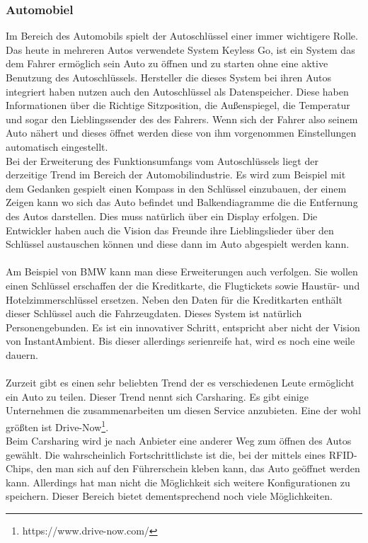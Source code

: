 \subsubsection{Automobiel} 
Im Bereich des Automobils spielt der Autoschlüssel einer immer wichtigere Rolle. Das heute in mehreren Autos verwendete System Keyless Go, ist ein System das dem Fahrer ermöglich sein Auto zu öffnen und zu starten ohne eine aktive Benutzung des Autoschlüssels. Hersteller die dieses System bei ihren Autos integriert haben nutzen auch den Autoschlüssel als Datenspeicher. Diese haben Informationen über die Richtige Sitzposition, die Außenspiegel, die Temperatur und sogar den Lieblingssender des des Fahrers. Wenn sich der Fahrer also seinem Auto nähert und dieses öffnet werden diese von ihm vorgenommen Einstellungen automatisch eingestellt. 
\\
Bei der Erweiterung des Funktionsumfangs vom Autoschlüssels liegt der derzeitige Trend im Bereich der Automobilindustrie.
Es wird zum Beispiel mit dem Gedanken gespielt einen Kompass in den Schlüssel einzubauen, der einem Zeigen kann wo sich das Auto befindet und Balkendiagramme die die Entfernung des Autos darstellen. Dies muss natürlich über ein Display erfolgen. 
Die Entwickler haben auch die Vision das Freunde ihre Lieblingslieder über den Schlüssel austauschen können und diese dann im Auto abgespielt werden kann. 
\\\\     
Am Beispiel von BMW kann man diese Erweiterungen auch verfolgen. Sie wollen einen Schlüssel erschaffen der die Kreditkarte, die Flugtickets sowie Haustür- und Hotelzimmerschlüssel ersetzen. 
Neben den Daten für die Kreditkarten enthält dieser Schlüssel auch die Fahrzeugdaten. Dieses System ist natürlich Personengebunden. Es ist ein innovativer Schritt, entspricht aber nicht der Vision von InstantAmbient.
Bis dieser allerdings serienreife hat, wird es noch eine weile dauern. 
\\\\
Zurzeit gibt es einen sehr beliebten Trend der es verschiedenen Leute ermöglicht ein Auto zu teilen. Dieser Trend nennt sich Carsharing. Es gibt einige Unternehmen die zusammenarbeiten um diesen Service anzubieten. Eine der wohl größten ist Drive-Now\footnote{https://www.drive-now.com/}. 
\\
Beim Carsharing wird je nach Anbieter eine anderer Weg zum öffnen des Autos gewählt. 
Die wahrscheinlich Fortschrittlichste ist die, bei der mittels eines RFID-Chips, den man sich auf den Führerschein kleben kann, das Auto geöffnet werden kann.  
Allerdings hat man nicht die Möglichkeit sich weitere Konfigurationen zu speichern. Dieser Bereich bietet dementsprechend noch viele Möglichkeiten.


